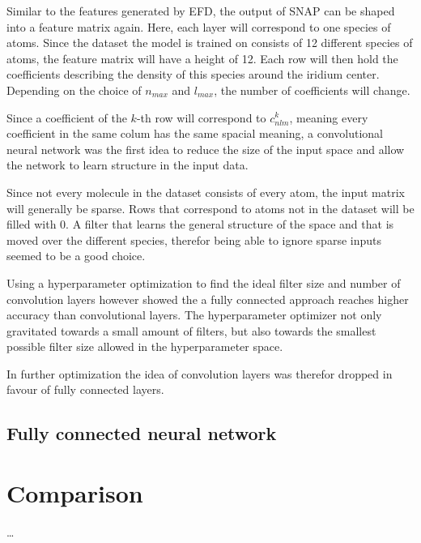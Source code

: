 Similar to the features generated by EFD, the output of SNAP can be shaped into a feature matrix again.
Here, each layer will correspond to one species of atoms.
Since the dataset the model is trained on consists of 12 different species of atoms, the feature matrix will have a height of 12.
Each row will then hold the coefficients describing the density of this species around the iridium center.
Depending on the choice of $n_{max}$ and $l_{max}$, the number of coefficients will change.

Since a coefficient of the $k$-th row will correspond to $c^k_{nlm}$, meaning every coefficient in the same colum has the same spacial meaning,
a convolutional neural network was the first idea to reduce the size of the input space and allow the network to learn structure in the input data.

Since not every molecule in the dataset consists of every atom, the input matrix will generally be sparse.
Rows that correspond to atoms not in the dataset will be filled with 0.
A filter that learns the general structure of the space and that is moved over the different species, therefor 
being able to ignore sparse inputs seemed to be a good choice.

Using a hyperparameter optimization to find the ideal filter size and number of convolution layers however showed
the a fully connected approach reaches higher accuracy than convolutional layers.
The hyperparameter optimizer not only gravitated towards a small amount of filters, but also towards 
the smallest possible filter size allowed in the hyperparameter space.

In further optimization the idea of convolution layers was therefor dropped in favour of fully connected layers.

\subsection{Fully connected neural network}


\section{Comparison}
\label{sec:Evaluation:Comparison}

\dots
